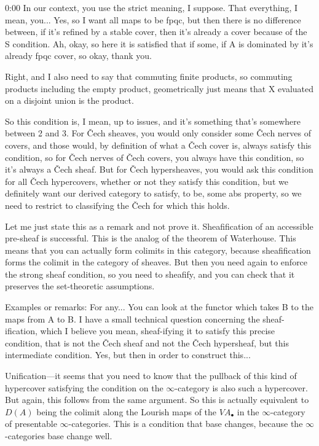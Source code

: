 \begin{unfinished}{0:00}
In our context, you use the strict meaning, I suppose. That everything, I mean, you... Yes, so I want all maps to be fpqc, but then there is no difference between, if it's refined by a stable cover, then it's already a cover because of the S condition. Ah, okay, so here it is satisfied that if some, if A is dominated by it's already fpqc cover, so okay, thank you.

Right, and I also need to say that commuting finite products, so commuting products including the empty product, geometrically just means that X evaluated on a disjoint union is the product.

So this condition is, I mean, up to issues, and it's something that's somewhere between 2 and 3. For Čech sheaves, you would only consider some Čech nerves of covers, and those would, by definition of what a Čech cover is, always satisfy this condition, so for Čech nerves of Čech covers, you always have this condition, so it's always a Čech sheaf. But for Čech hypersheaves, you would ask this condition for all Čech hypercovers, whether or not they satisfy this condition, but we definitely want our derived category to satisfy, to be, some abs property, so we need to restrict to classifying the Čech for which this holds.

Let me just state this as a remark and not prove it. Sheafification of an accessible pre-sheaf is successful. This is the analog of the theorem of Waterhouse. This means that you can actually form colimits in this category, because sheafification forms the colimit in the category of sheaves. But then you need again to enforce the strong sheaf condition, so you need to sheafify, and you can check that it preserves the set-theoretic assumptions.

Examples or remarks: For any... You can look at the functor which takes B to the maps from A to B. I have a small technical question concerning the sheaf-ification, which I believe you mean, sheaf-ifying it to satisfy this precise condition, that is not the Čech sheaf and not the Čech hypersheaf, but this intermediate condition. Yes, but then in order to construct this...



Unification---it seems that you need to know that the pullback of this kind of hypercover satisfying the condition on the $\infty$-category is also such a hypercover. But again, this follows from the same argument. So this is actually equivalent to $D(A)$ being the colimit along the Lourish maps of the $VA_\bullet$ in the $\infty$-category of presentable $\infty$-categories. This is a condition that base changes, because the $\infty$-categories base change well.


\end{unfinished}

